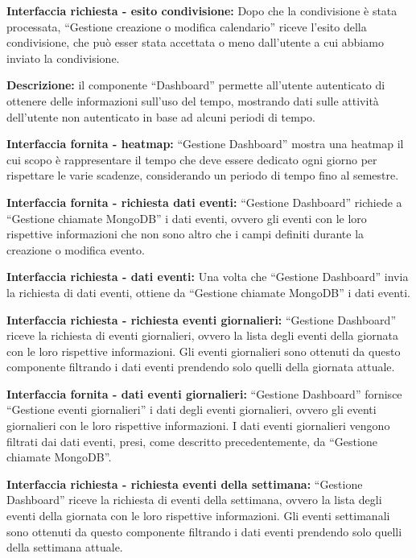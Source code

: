 \begin{listaPersonale}[]{}
    \textbf{Interfaccia richiesta - esito condivisione:} Dopo che la condivisione è stata processata, “Gestione creazione o modifica calendario” riceve l'esito della condivisione, che può esser stata accettata o meno dall'utente a cui abbiamo inviato la condivisione.



    \textbf{Descrizione:} il componente “Dashboard” permette all'utente autenticato di ottenere delle informazioni sull'uso del tempo,  mostrando dati sulle attività dell'utente non autenticato in base ad alcuni periodi di tempo.

    \textbf{Interfaccia fornita - heatmap:}  “Gestione Dashboard” mostra una heatmap il cui scopo è rappresentare il tempo che deve essere dedicato ogni giorno per rispettare le varie scadenze, considerando un periodo di tempo fino al semestre.

    \textbf{Interfaccia fornita - richiesta dati eventi:} “Gestione Dashboard” richiede a “Gestione chiamate MongoDB” i dati eventi, ovvero gli eventi con le loro rispettive informazioni che non sono altro che i campi definiti durante la creazione o modifica evento.

    \textbf{Interfaccia richiesta - dati eventi:} Una volta che “Gestione Dashboard” invia la richiesta di dati eventi, ottiene da “Gestione chiamate MongoDB” i dati eventi.

    \textbf{Interfaccia richiesta - richiesta eventi giornalieri:} “Gestione Dashboard” riceve la richiesta di eventi giornalieri, ovvero la lista degli eventi della giornata con le loro rispettive informazioni.
    Gli eventi giornalieri sono ottenuti da questo componente filtrando i dati eventi prendendo solo quelli della giornata attuale.

    \textbf{Interfaccia fornita - dati eventi giornalieri:} “Gestione Dashboard” fornisce “Gestione eventi giornalieri” i dati degli eventi giornalieri, ovvero gli eventi giornalieri con le loro rispettive informazioni. I dati eventi giornalieri vengono filtrati dai dati eventi, presi, come descritto precedentemente, da “Gestione chiamate MongoDB”.

    \textbf{Interfaccia richiesta - richiesta eventi della settimana:} “Gestione Dashboard” riceve la richiesta di eventi della settimana, ovvero la lista degli eventi della giornata con le loro rispettive informazioni. Gli eventi settimanali sono ottenuti da questo componente filtrando i dati eventi prendendo solo quelli della settimana attuale.


\end{listaPersonale}
